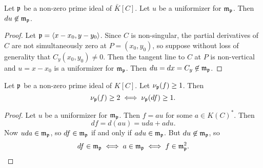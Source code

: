 \begin{lemma}
  \label{lem_differential_of_uniformizer}
  Let $\frak p$ be a non-zero prime ideal of $\bar K[C]$.
  Let $u$ be a uniformizer for $\frak m_{\frak p}$.
  Then $du \not \in \frak m_{\frak p}$.
\end{lemma}
\begin{proof}
  Let $\frak p = \left\langle x - x_0, y - y_0 \right\rangle$.
  Since $C$ is non-singular, the partial derivatives of $C$ are not simultaneously zero at $P = (x_0, y_0)$,
  so suppose without loss of generality that $C_y(x_0, y_0) \neq 0$.
  Then the tangent line to $C$ at $P$ is non-vertical and $u = x - x_0$ is a uniformizer for $\frak m_{\frak p}$.
  Then $du = dx = C_y \not\in \frak m_{\frak p}$.
\end{proof}
\begin{theorem}
  Let $\frak p$ be a non-zero prime ideal of $K[C]$.
  Let $\nu_{\frak p}(f) \geq 1$. Then
  \[ \nu_{\frak p}(f) \geq 2 \iff \nu_{\frak p}(df) \geq 1. \]
\end{theorem}
\begin{proof}
  Let $u$ be a uniformizer for $\frak m_{\frak p}$.
  Then $f = au$ for some $a \in K(C)^*$. Then
  \[ df = d(au) = uda + adu. \]
  Now $uda \in \frak m_{\frak p}$,
  so $df \in \frak m_{\frak p}$ if and only if $adu \in \frak m_{\frak p}$.
  But $du \not\in \frak m_{\frak p}$, so
  \[ df \in \frak m_{\frak p} \iff a \in \frak m_{\frak p} \iff f \in \frak m_{\frak p}^2. \qedhere \]
\end{proof}
